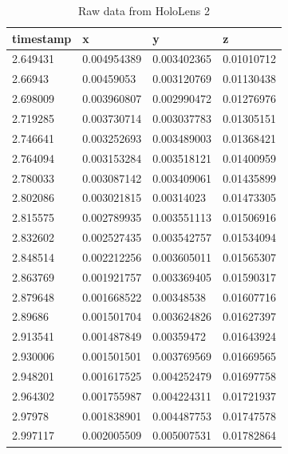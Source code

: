 \begin{table}[!ht]
		\footnotesize
		\centering
	\begin{tabular}{|l|l|l|l|}
		\hline
		timestamp & x & y & z \\ [0.5ex] 
		\hline\hline
		2.649431 & 0.004954389 & 0.003402365 & 0.01010712 \\ \hline
		2.66943 & 0.00459053 & 0.003120769 & 0.01130438 \\ \hline
		2.698009 & 0.003960807 & 0.002990472 & 0.01276976 \\ \hline
		2.719285 & 0.003730714 & 0.003037783 & 0.01305151 \\ \hline
		2.746641 & 0.003252693 & 0.003489003 & 0.01368421 \\ \hline
		2.764094 & 0.003153284 & 0.003518121 & 0.01400959 \\ \hline
		2.780033 & 0.003087142 & 0.003409061 & 0.01435899 \\ \hline
		2.802086 & 0.003021815 & 0.00314023 & 0.01473305 \\ \hline
		2.815575 & 0.002789935 & 0.003551113 & 0.01506916 \\ \hline
		2.832602 & 0.002527435 & 0.003542757 & 0.01534094 \\ \hline
		2.848514 & 0.002212256 & 0.003605011 & 0.01565307 \\ \hline
		2.863769 & 0.001921757 & 0.003369405 & 0.01590317 \\ \hline
		2.879648 & 0.001668522 & 0.00348538 & 0.01607716 \\ \hline
		2.89686 & 0.001501704 & 0.003624826 & 0.01627397 \\ \hline
		2.913541 & 0.001487849 & 0.00359472 & 0.01643924 \\ \hline
		2.930006 & 0.001501501 & 0.003769569 & 0.01669565 \\ \hline
		2.948201 & 0.001617525 & 0.004252479 & 0.01697758 \\ \hline
		2.964302 & 0.001755987 & 0.004224311 & 0.01721937 \\ \hline
		2.97978 & 0.001838901 & 0.004487753 & 0.01747578 \\ \hline
		2.997117 & 0.002005509 & 0.005007531 & 0.01782864 \\ \hline
	\end{tabular}
\caption{\label{tab:raw_data}Raw data from HoloLens 2}
\end{table}

